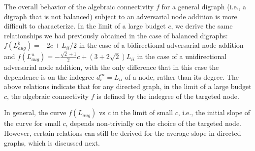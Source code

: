 \documentclass[%
 reprint,
 amsmath,amssymb,
 aip,
]{revtex4-2}
\theoremstyle{italichead}
\theoremstyle{definition}
\begin{document}
{The overall behavior of the algebraic connectivity $f$ for a general digraph (i.e., a digraph that is not balanced) subject to an adversarial node addition is more difficult to characterize. 
In the limit of a large budget $c$, we derive the same relationships we had previously obtained in the case of balanced digraphs: %
    $f(L_{aug}^b) = -2c + L_{ii}/2$ in the case of a bidirectional adversarial node addition and
    $f(L_{aug}^u) = -\frac{\sqrt{2}+1}{2}c + (3+2\sqrt{2})  L_{ii}$ in the case of a unidirectional adversarial node addition,
with the only difference that in this case the dependence is on the indegree $d_i^{in}=L_{ii}$ of a node, rather than its degree.
The above relations  indicate that for any directed graph, in the limit of a large budget $c$, the algebraic connectivity $f$ is defined by the indegree of the targeted node. 




In general, the curve $f(L_{aug})$ vs $c$ in the limit of small $c$, i.e., the initial slope of the curve for small $c$, depends non-trivially on the choice of the targeted node. 
However, certain relations can still be derived for the average slope in directed graphs, which is discussed next.








}
\end{document}

